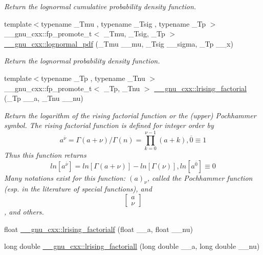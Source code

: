 \begin{DoxyCompactItemize}
\begin{DoxyCompactList}\small\item\em Return the lognormal cumulative probability density function. \end{DoxyCompactList}\item 
{\footnotesize template$<$typename \+\_\+\+Tmu , typename \+\_\+\+Tsig , typename \+\_\+\+Tp $>$ }\\\+\_\+\+\_\+gnu\+\_\+cxx\+::fp\+\_\+promote\+\_\+t$<$ \+\_\+\+Tmu, \+\_\+\+Tsig, \+\_\+\+Tp $>$ \hyperlink{group__gnu__math__spec__func_gaef4db41e58e53144df2ddcc834d88e0b}{\+\_\+\+\_\+gnu\+\_\+cxx\+::lognormal\+\_\+pdf} (\+\_\+\+Tmu \+\_\+\+\_\+mu, \+\_\+\+Tsig \+\_\+\+\_\+sigma, \+\_\+\+Tp \+\_\+\+\_\+x)
\begin{DoxyCompactList}\small\item\em Return the lognormal probability density function. \end{DoxyCompactList}\item 
{\footnotesize template$<$typename \+\_\+\+Tp , typename \+\_\+\+Tnu $>$ }\\\+\_\+\+\_\+gnu\+\_\+cxx\+::fp\+\_\+promote\+\_\+t$<$ \+\_\+\+Tp, \+\_\+\+Tnu $>$ \hyperlink{group__gnu__math__spec__func_ga8912b75b2f7592fb61128c766e7313b9}{\+\_\+\+\_\+gnu\+\_\+cxx\+::lrising\+\_\+factorial} (\+\_\+\+Tp \+\_\+\+\_\+a, \+\_\+\+Tnu \+\_\+\+\_\+nu)
\begin{DoxyCompactList}\small\item\em Return the logarithm of the rising factorial function or the (upper) Pochhammer symbol. The rising factorial function is defined for integer order by \[ a^{\overline{\nu}} = \Gamma(a + \nu) / \Gamma(n) = \prod_{k=0}^{\nu-1} (a + k), \overline{0} \equiv 1 \] Thus this function returns \[ ln[a^{\overline{\nu}}] = ln[\Gamma(a + \nu)] - ln[\Gamma(\nu)], ln[a^{\overline{0}}] \equiv 0 \] Many notations exist for this function\+: $ (a)_\nu $, called the Pochhammer function (esp. in the literature of special functions), and \[ \left[ \begin{array}{c} a \\ \nu \end{array} \right] \], and others. \end{DoxyCompactList}\item 
float \hyperlink{group__gnu__math__spec__func_ga68c64f4e44d03b5b3f75f90dbe2e0819}{\+\_\+\+\_\+gnu\+\_\+cxx\+::lrising\+\_\+factorialf} (float \+\_\+\+\_\+a, float \+\_\+\+\_\+nu)
\item 
long double \hyperlink{group__gnu__math__spec__func_ga1ac811f56f38f7ea7a1e035ec0157f6b}{\+\_\+\+\_\+gnu\+\_\+cxx\+::lrising\+\_\+factoriall} (long double \+\_\+\+\_\+a, long double \+\_\+\+\_\+nu)

\end{DoxyCompactItemize}
